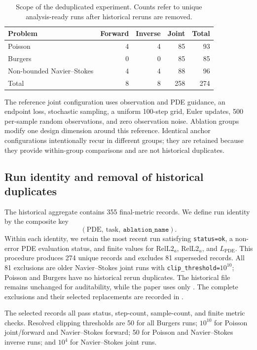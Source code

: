 \documentclass[twoside,11pt]{article}
\newcommand{\relA}{\mathrm{RelL2}_a}
\newcommand{\relU}{\mathrm{RelL2}_u}
\newcommand{\Lpde}{L_{\mathrm{PDE}}}
\begin{document}
\begin{table}[t]
\caption{Scope of the deduplicated experiment.  Counts refer to unique
analysis-ready runs after historical reruns are removed.}
\label{tab:scope}
\centering
\begin{tabular}{lrrrr}
\toprule
Problem & Forward & Inverse & Joint & Total \\
\midrule
Poisson & 4 & 4 & 85 & 93 \\
Burgers & 0 & 0 & 85 & 85 \\
Non-bounded Navier--Stokes & 4 & 4 & 88 & 96 \\
\midrule
Total & 8 & 8 & 258 & 274 \\
\bottomrule
\end{tabular}
\end{table}

The reference joint configuration uses observation and PDE guidance, an
endpoint loss, stochastic sampling, a uniform 100-step grid, Euler updates,
500 per-sample random observations, and zero observation noise.  Ablation
groups modify one design dimension around this reference.  Identical anchor
configurations intentionally recur in different groups; they are retained
because they provide within-group comparisons and are not historical
duplicates.

\subsection{Run identity and removal of historical duplicates}
\label{sec:dedup}

The historical aggregate contains 355 final-metric records.  We define run
identity by the composite key
\[
  (\text{PDE},\ \text{task},\ \texttt{ablation\_name}).
\]
Within each identity, we retain the most recent run satisfying
\texttt{status=ok}, a non-error PDE evaluation status, and finite values for
\(\relA\), \(\relU\), and \(\Lpde\).  This procedure produces 274 unique
records and excludes 81 superseded records.  All 81 exclusions are older
Navier--Stokes joint runs with \texttt{clip\_threshold=}\(10^{10}\); Poisson
and Burgers have no historical rerun duplicates.  The historical file remains
unchanged for auditability, while the paper uses only
.  The complete exclusions and their selected
replacements are recorded in .

The selected records all pass status, step-count, sample-count, and finite
metric checks.  Resolved clipping thresholds are 50 for all Burgers runs;
\(10^{10}\) for Poisson joint/forward and Navier--Stokes forward; 50 for
Poisson and Navier--Stokes inverse runs; and \(10^4\) for Navier--Stokes
joint runs.
\end{document}
